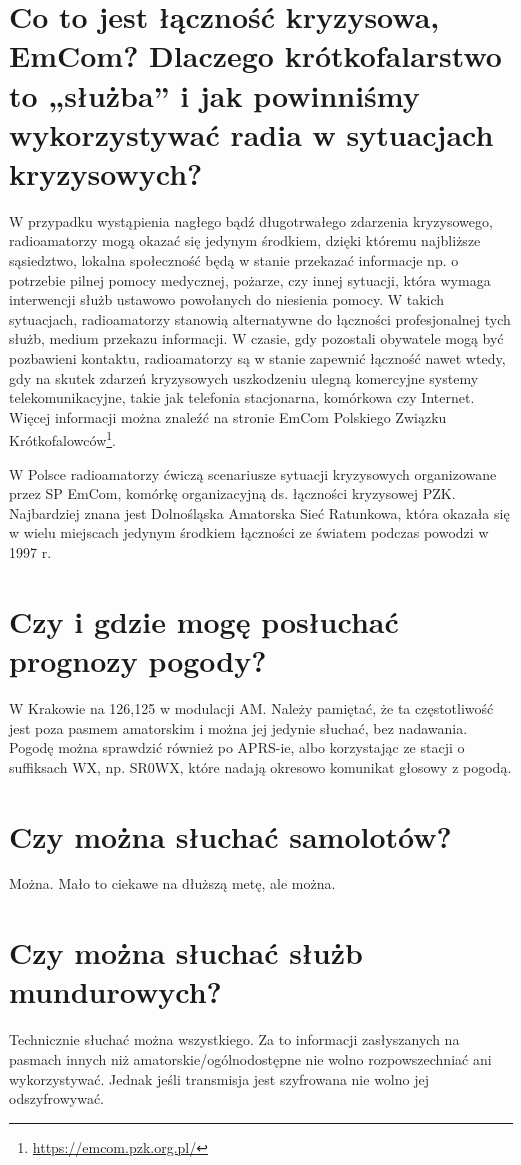 \documentclass[a4paper,12pt]{article}
\begin{document}
\section{Co to jest łączność kryzysowa, EmCom? Dlaczego krótkofalarstwo to „służba” i jak powinniśmy wykorzystywać radia w sytuacjach kryzysowych?}
W przypadku wystąpienia nagłego bądź długotrwałego zdarzenia kryzysowego, radioamatorzy mogą okazać się jedynym środkiem, dzięki któremu najbliższe sąsiedztwo, lokalna społeczność będą w stanie przekazać informacje np. o potrzebie pilnej pomocy medycznej, pożarze, czy innej sytuacji, która wymaga interwencji służb ustawowo powołanych do niesienia pomocy. W takich sytuacjach, radioamatorzy stanowią alternatywne do łączności profesjonalnej tych służb, medium przekazu informacji. W czasie, gdy pozostali obywatele mogą być pozbawieni kontaktu, radioamatorzy są w stanie zapewnić łączność nawet wtedy, gdy na skutek zdarzeń kryzysowych uszkodzeniu ulegną komercyjne systemy telekomunikacyjne, takie jak telefonia stacjonarna, komórkowa czy Internet. Więcej informacji można znaleźć na stronie EmCom Polskiego Związku Krótkofalowców\footnote{\url{https://emcom.pzk.org.pl/}}.

W Polsce radioamatorzy ćwiczą scenariusze sytuacji kryzysowych organizowane przez SP EmCom, komórkę organizacyjną ds. łączności kryzysowej PZK. Najbardziej znana jest Dolnośląska Amatorska Sieć Ratunkowa, która okazała się w wielu miejscach jedynym środkiem łączności ze światem podczas powodzi w 1997 r.

\section{Czy i gdzie mogę posłuchać prognozy pogody?}
W Krakowie na 126,125 w modulacji AM. Należy pamiętać, że ta częstotliwość jest poza pasmem amatorskim i można jej jedynie słuchać, bez nadawania.
Pogodę można sprawdzić również po APRS-ie, albo korzystając ze stacji o suffiksach WX, np. SR0WX, które nadają okresowo komunikat głosowy z pogodą.

\section{Czy można słuchać samolotów?}
Można. Mało to ciekawe na dłuższą metę, ale można.

\section{Czy można słuchać służb mundurowych?}
Technicznie słuchać można wszystkiego. Za to informacji zasłyszanych na pasmach innych niż amatorskie/ogólnodostępne nie wolno rozpowszechniać ani wykorzystywać. Jednak jeśli transmisja jest szyfrowana nie wolno jej odszyfrowywać.
\end{document}

